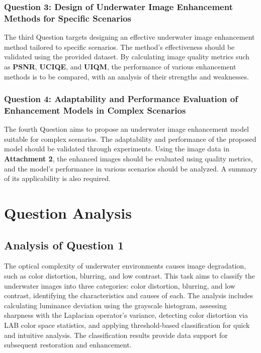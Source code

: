 \documentclass[withoutpreface,bwprint]{cumcmthesis}
\begin{document}
\subsubsection{Question 3: Design of Underwater Image Enhancement Methods for Specific Scenarios}

The third Question targets designing an effective underwater image enhancement method tailored to specific scenarios. The method's effectiveness should be validated using the provided dataset. By calculating image quality metrics such as \textbf{PSNR}, \textbf{UCIQE}, and \textbf{UIQM}, the performance of various enhancement methods is to be compared, with an analysis of their strengths and weaknesses.

\subsubsection{Question 4: Adaptability and Performance Evaluation of Enhancement Models in Complex Scenarios}

The fourth Question aims to propose an underwater image enhancement model suitable for complex scenarios. The adaptability and performance of the proposed model should be validated through experiments. Using the image data in \textbf{Attachment 2}, the enhanced images should be evaluated using quality metrics, and the model's performance in various scenarios should be analyzed. A summary of its applicability is also required.
\newpage
\section{Question Analysis}

\subsection{Analysis of Question 1}

The optical complexity of underwater environments causes image degradation, such as color distortion, blurring, and low contrast. This task aims to classify the underwater images into three categories: color distortion, blurring, and low contrast, identifying the characteristics and causes of each. The analysis includes calculating luminance deviation using the grayscale histogram, assessing sharpness with the Laplacian operator's variance, detecting color distortion via LAB color space statistics, and applying threshold-based classification for quick and intuitive analysis. The classification results provide data support for subsequent restoration and enhancement.
\end{document}
